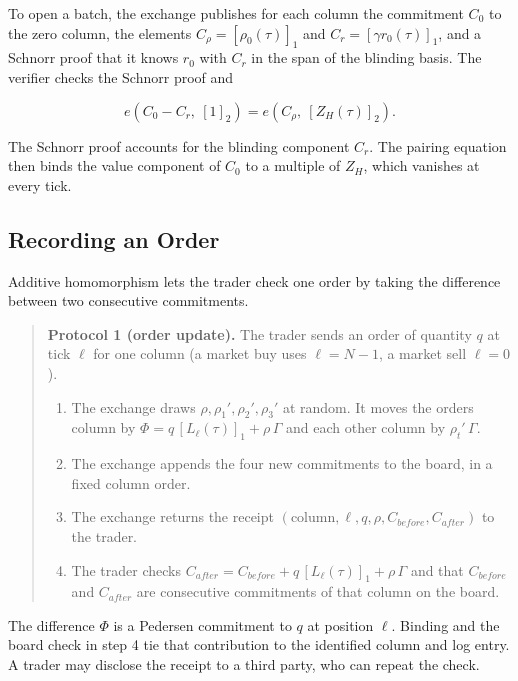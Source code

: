 To open a batch, the exchange publishes for each column the commitment \(C_0\) to the zero column, the elements \(C_\rho = [\rho_0(\tau)]_1\) and \(C_r = [\gamma r_0(\tau)]_1\), and a Schnorr proof \cite{Sch91} that it knows \(r_0\) with \(C_r\) in the span of the blinding basis. The verifier checks the Schnorr proof and

\[e(C_0 - C_r,\ [1]_2) = e(C_\rho,\ [Z_H(\tau)]_2).\]

The Schnorr proof accounts for the blinding component \(C_r\). The pairing equation then binds the value component of \(C_0\) to a multiple of \(Z_H\), which vanishes at every tick.

\subsection{Recording an Order}

Additive homomorphism lets the trader check one order by taking the difference between two consecutive commitments.

\begin{quote}
\textbf{Protocol 1 (order update).} The trader sends an order of quantity \(q\) at tick \(\ell\) for one column (a market buy uses \(\ell = N-1\), a market sell \(\ell = 0\)).

\begin{enumerate}
\def\labelenumi{\arabic{enumi}.}
\item
  The exchange draws \(\rho, \rho_1', \rho_2', \rho_3'\) at random. It moves the order\textquotesingle s column by \(\Phi = q\,[L_\ell(\tau)]_1 + \rho\,\Gamma\) and each other column by \(\rho_t'\,\Gamma\).
\item
  The exchange appends the four new commitments to the board, in a fixed column order.
\item
  The exchange returns the receipt \((\text{column}, \ell, q, \rho, C_{before}, C_{after})\) to the trader.
\item
  The trader checks \(C_{after} = C_{before} + q\,[L_\ell(\tau)]_1 + \rho\,\Gamma\) and that \(C_{before}\) and \(C_{after}\) are consecutive commitments of that column on the board.
\end{enumerate}
\end{quote}

The difference \(\Phi\) is a Pedersen commitment \cite{pedersen1991} to \(q\) at position \(\ell\). Binding and the board check in step 4 tie that contribution to the identified column and log entry. A trader may disclose the receipt to a third party, who can repeat the check.

